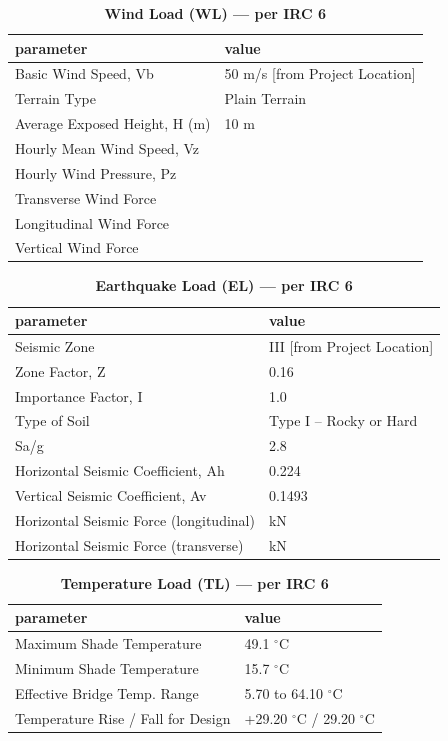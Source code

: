 \documentclass[12pt,a4paper]{report}
\numberwithin{table}{chapter}
\numberwithin{figure}{chapter}
\begin{document}
\vspace{1em}
\begin{longtable}{|L{5.5cm}|p{10.0cm}|}
\caption{\textbf{Wind Load (WL) --- per IRC 6}}
\hline
\textbf{parameter} & \textbf{value} \\
\hline
\textnormal{Basic Wind Speed, Vb} & 50 m/s [from Project Location] \\[6pt]
\hline
\textnormal{Terrain Type} & Plain Terrain \\[6pt]
\hline
\textnormal{Average Exposed Height, H (m)} & 10 m \\[6pt]
\hline
\textnormal{Hourly Mean Wind Speed, Vz} &  \\[6pt]
\hline
\textnormal{Hourly Wind Pressure, Pz} &  \\[6pt]
\hline
\textnormal{Transverse Wind Force} &  \\[6pt]
\hline
\textnormal{Longitudinal Wind Force} &  \\[6pt]
\hline
\textnormal{Vertical Wind Force} &  \\[6pt]
\hline
\end{longtable}

\vspace{1em}
\begin{longtable}{|L{5.5cm}|p{10.0cm}|}
\caption{\textbf{Earthquake Load (EL) --- per IRC 6}}
\hline
\textbf{parameter} & \textbf{value} \\
\hline
\textnormal{Seismic Zone} & III [from Project Location] \\[6pt]
\hline
\textnormal{Zone Factor, Z} & 0.16 \\[6pt]
\hline
\textnormal{Importance Factor, I} & 1.0 \\[6pt]
\hline
\textnormal{Type of Soil} & Type I – Rocky or Hard \\[6pt]
\hline
\textnormal{Sa/g} & 2.8 \\[6pt]
\hline
\textnormal{Horizontal Seismic Coefficient, Ah} & 0.224 \\[6pt]
\hline
\textnormal{Vertical Seismic Coefficient, Av} & 0.1493 \\[6pt]
\hline
\textnormal{Horizontal Seismic Force (longitudinal)} &  kN \\[6pt]
\hline
\textnormal{Horizontal Seismic Force (transverse)} &  kN \\[6pt]
\hline
\end{longtable}

\vspace{1em}
\begin{longtable}{|L{5.5cm}|p{10.0cm}|}
\caption{\textbf{Temperature Load (TL) --- per IRC 6}}
\hline
\textbf{parameter} & \textbf{value} \\
\hline
\textnormal{Maximum Shade Temperature} & 49.1 $^\circ$C \\[6pt]
\hline
\textnormal{Minimum Shade Temperature} & 15.7 $^\circ$C \\[6pt]
\hline
\textnormal{Effective Bridge Temp. Range} & 5.70 to 64.10 $^\circ$C \\[6pt]
\hline
\textnormal{Temperature Rise / Fall for Design} & +29.20 $^\circ$C / \textminus{}29.20 $^\circ$C \\[6pt]
\hline
\end{longtable}
\end{document}
